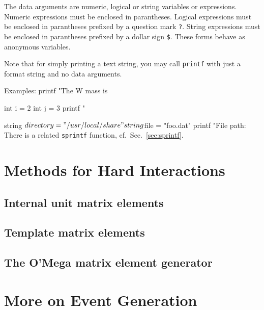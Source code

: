 \documentclass[12pt]{book}
\newenvironment{code}%
  {\begingroup\footnotesize
   \quote
   \verbatim}%
  {\endverbatim
   \endquote
   \endgroup\noindent}
\newcommand{\ttt}[1]{\texttt{#1}}
\begin{document}
The data arguments are numeric, logical or string variables or expressions.
Numeric expressions must be enclosed in parantheses.  Logical expressions must
be enclosed in parantheses prefixed by a question mark \verb|?|.  String
expressions must be enclosed in parantheses prefixed by a dollar sign
\verb|$|.  These forms behave as anonymous variables.

Note that for simply printing a text string, you may call \ttt{printf} with
just a format string and no data arguments.

Examples:
\begin{code}
printf "The W mass is %

int i = 2
int j = 3
printf "%

string $directory = "/usr/local/share"
string $file = "foo.dat"
printf "File path: %
\end{code}
There is a related \ttt{sprintf} function, cf.~Sec.~\ref{sec:sprintf}.



\chapter{Methods for Hard Interactions}
\label{chap:hardint}

\section{Internal unit matrix elements}
\label{sec:unit_me}


\section{Template matrix elements}
\label{sec:template_me}


\section{The O'Mega matrix element generator}
\label{sec:omega_me}


\chapter{More on Event Generation}
\label{sec:events}
\end{document}
